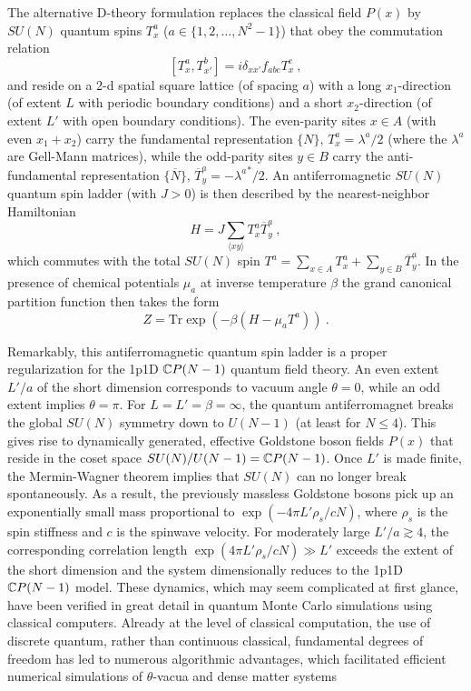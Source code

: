 The alternative D-theory formulation replaces the classical field $P(x)$ by $SU(N)$ quantum spins $T^a_x$ ($a \in \{1,2,\dots,N^2-1\}$) that obey the commutation relation
\[[T_x^a,T_{x'}^b] = i \delta_{xx'} f_{abc} T_x^c \ ,\] and reside on a 2-d spatial square lattice (of spacing $a$) with a long  $x_1$-direction (of extent $L$ with periodic boundary conditions) and a short $x_2$-direction (of extent $L'$ with open boundary conditions).
The even-parity sites $x \in A$ (with even $x_1 + x_2$) carry the fundamental representation 
$\{N\}$, $T_x^a = \lambda^a/2$ (where the $\lambda^a$ are Gell-Mann matrices), while the odd-parity sites $y \in B$ carry the anti-fundamental representation $\{\overline{N}\}$, $\overline{T}^a_y = - {\lambda^a}^*/2$. 
An antiferromagnetic $SU(N)$ quantum spin ladder (with $J > 0$) is then described by the 
nearest-neighbor Hamiltonian
\[H = J \sum_{\langle xy \rangle} T^a_x \overline{T}^a_y \ ,\] which commutes with the total $SU(N)$ spin $T^a = \sum_{x \in A} T^a_x + \sum_{y \in B} \overline{T}^a_y$.
In the presence of chemical potentials $\mu_a$ at inverse temperature $\beta$
the grand canonical partition function then takes the form
\[Z = \mbox{Tr} \exp(- \beta (H - \mu_a T^a)) \ .\]

Remarkably, this antiferromagnetic quantum spin ladder is a proper regularization for the \gls{1p1D} ${\mathbb{C}P}(N-1)$ quantum field theory. An even extent $L'/a$ of the short dimension corresponds to vacuum angle $\theta = 0$, while an odd extent implies $\theta = \pi$. For $L = L' = \beta = \infty$, the quantum antiferromagnet breaks the global $SU(N)$ symmetry down to $U(N-1)$ (at least for $N \leq 4$). 
This gives rise to dynamically generated, effective Goldstone boson fields $P(x)$ that reside in the coset space $SU(N)/U(N-1) = {\mathbb{C}P}(N-1)$.
Once $L'$ is made finite, the Mermin-Wagner theorem implies that $SU(N)$ can no longer break spontaneously. As a result, the previously massless Goldstone bosons pick up an exponentially small mass proportional to $\exp\left(- 4 \pi L' \rho_s/c N\right)$, where $\rho_s$ is the spin stiffness and $c$ is the spinwave velocity. 
For moderately large $L'/a \gtrsim 4$, the corresponding correlation length $\exp\left(4 \pi L' \rho_s/c N\right) \gg L'$ exceeds the extent of the short dimension and the system dimensionally reduces to the \gls{1p1D} ${\mathbb{C}P}(N-1)$ model. 
These dynamics, which may seem complicated at first glance, have been verified in great detail in quantum Monte Carlo simulations using classical computers. Already at the level of classical computation, the use of discrete quantum, rather than continuous classical, fundamental degrees of freedom has led to numerous algorithmic advantages, which facilitated efficient numerical simulations of $\theta$-vacua and
dense matter systems \cite{beard2005study,evans20183}

